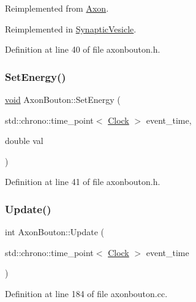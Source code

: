 Reimplemented from \mbox{\hyperlink{class_axon_a3493cb97bde26bd66facc6084cd5f219}{Axon}}.



Reimplemented in \mbox{\hyperlink{class_synaptic_vesicle_a7fd7cfce5eccb904206d968866f85220}{Synaptic\+Vesicle}}.



Definition at line 40 of file axonbouton.\+h.

\mbox{\label{class_axon_bouton_ab24fa467ab7221d0577e54734684a491}} 
\subsubsection{\texorpdfstring{Set\+Energy()}{SetEnergy()}}
{\footnotesize\ttfamily \mbox{\hyperlink{glad_8h_a950fc91edb4504f62f1c577bf4727c29}{void}} Axon\+Bouton\+::\+Set\+Energy (\begin{DoxyParamCaption}\item[{std\+::chrono\+::time\+\_\+point$<$ \mbox{\hyperlink{universe_8h_a0ef8d951d1ca5ab3cfaf7ab4c7a6fd80}{Clock}} $>$}]{event\+\_\+time,  }\item[{double}]{val }\end{DoxyParamCaption})\hspace{0.3cm}{\ttfamily [inline]}}



Definition at line 41 of file axonbouton.\+h.

\mbox{\label{class_axon_bouton_a26f89bac681b8f0894fe1ae249733917}} 
\subsubsection{\texorpdfstring{Update()}{Update()}}
{\footnotesize\ttfamily int Axon\+Bouton\+::\+Update (\begin{DoxyParamCaption}\item[{std\+::chrono\+::time\+\_\+point$<$ \mbox{\hyperlink{universe_8h_a0ef8d951d1ca5ab3cfaf7ab4c7a6fd80}{Clock}} $>$}]{event\+\_\+time }\end{DoxyParamCaption})}



Definition at line 184 of file axonbouton.\+cc.

